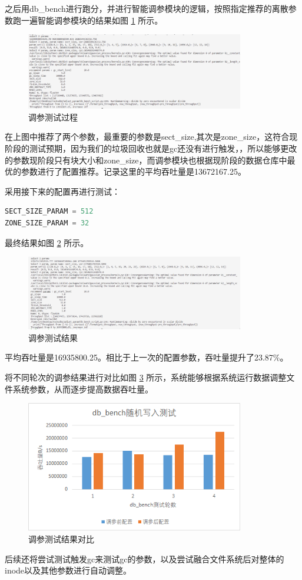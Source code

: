 之后用db\_bench进行跑分，并进行智能调参模块的逻辑，按照指定推荐的离散参数跑一遍智能调参模块的结果如图 \ref{test-turnner2} 所示。

\begin{figure}[htbp]
  \centering
  \includegraphics[width=0.85\textwidth]{fig/turnner2}
  \caption{ 调参测试过程 }
  \label{test-turnner2}
\end{figure}

在上图中推荐了两个参数，最重要的参数是sect\_size,其次是zone\_size，这符合现阶段的测试预期，因为我们的垃圾回收也就是gc还没有进行触发，，所以能够更改的参数现阶段只有块大小和zone\_size，而调参模块也根据现阶段的数据仓库中最优的参数进行了配置推荐。记录这里的平均吞吐量是13672167.25。

采用接下来的配置再进行测试：

\begin{lstlisting}[language=Python]
SECT_SIZE_PARAM = 512
ZONE_SIZE_PARAM = 32
\end{lstlisting}

最终结果如图 \ref{test-turnner3} 所示。

\begin{figure}[htbp]
  \centering
  \includegraphics[width=0.85\textwidth]{fig/turnner3}
  \caption{ 调参测试结果 }
  \label{test-turnner3}
\end{figure}

平均吞吐量是16935800.25。相比于上一次的配置参数，吞吐量提升了23.87\%。

将不同轮次的调参结果进行对比如图 \ref{test-turnner} 所示，系统能够根据系统运行数据调整文件系统参数，从而逐步提高数据吞吐量。

\begin{figure}[htbp]
  \centering
  \includegraphics[width=0.85\textwidth]{fig/test-turnner}
  \caption{ 调参测试结果对比 }
  \label{test-turnner}
\end{figure}

后续还将尝试测试触发gc来测试gc的参数，以及尝试融合文件系统后对整体的inode以及其他参数进行自动调整。

